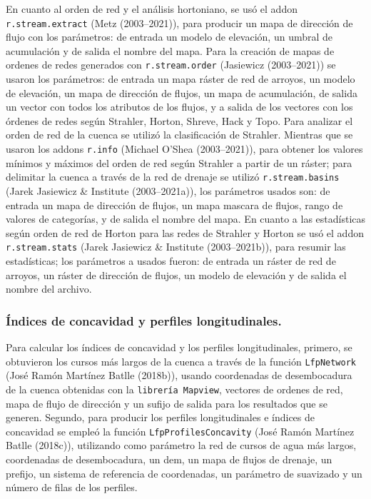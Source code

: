 \documentclass[11pt,]{article}
\begin{document}
En cuanto al orden de red y el análisis hortoniano, se usó el addon
\texttt{r.stream.extract} (Metz (2003--2021)), para producir un mapa de
dirección de flujo con los parámetros: de entrada un modelo de
elevación, un umbral de acumulación y de salida el nombre del mapa. Para
la creación de mapas de ordenes de redes generados con
\texttt{r.stream.order} (Jasiewicz (2003--2021)) se usaron los
parámetros: de entrada un mapa ráster de red de arroyos, un modelo de
elevación, un mapa de dirección de flujos, un mapa de acumulación, de
salida un vector con todos los atributos de los flujos, y a salida de
los vectores con los órdenes de redes según Strahler, Horton, Shreve,
Hack y Topo. Para analizar el orden de red de la cuenca se utilizó la
clasificación de Strahler. Mientras que se usaron los addons
\texttt{r.info} (Michael O'Shea (2003--2021)), para obtener los valores
mínimos y máximos del orden de red según Strahler a partir de un ráster;
para delimitar la cuenca a través de la red de drenaje se utilizó
\texttt{r.stream.basins} (Jarek Jasiewicz \& Institute (2003--2021a)),
los parámetros usados son: de entrada un mapa de dirección de flujos, un
mapa mascara de flujos, rango de valores de categorías, y de salida el
nombre del mapa. En cuanto a las estadísticas según orden de red de
Horton para las redes de Strahler y Horton se usó el addon
\texttt{r.stream.stats} (Jarek Jasiewicz \& Institute (2003--2021b)),
para resumir las estadísticas; los parámetros a usados fueron: de
entrada un ráster de red de arroyos, un ráster de dirección de flujos,
un modelo de elevación y de salida el nombre del archivo.

\subsubsection{Índices de concavidad y perfiles
longitudinales.}\label{uxedndices-de-concavidad-y-perfiles-longitudinales.}

Para calcular los índices de concavidad y los perfiles longitudinales,
primero, se obtuvieron los cursos más largos de la cuenca a través de la
función \texttt{LfpNetwork} (José Ramón Martínez Batlle (2018b)), usando
coordenadas de desembocadura de la cuenca obtenidas con la
\texttt{librería\ Mapview}, vectores de ordenes de red, mapa de flujo de
dirección y un sufijo de salida para los resultados que se generen.
Segundo, para producir los perfiles longitudinales e índices de
concavidad se empleó la función \texttt{LfpProfilesConcavity} (José
Ramón Martínez Batlle (2018c)), utilizando como parámetro la red de
cursos de agua más largos, coordenadas de desembocadura, un dem, un mapa
de flujos de drenaje, un prefijo, un sistema de referencia de
coordenadas, un parámetro de suavizado y un número de filas de los
perfiles.
\end{document}
